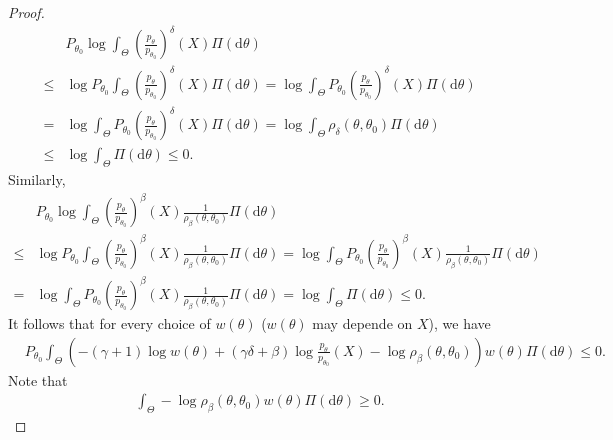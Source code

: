 \documentclass[11pt]{article}
\theoremstyle{plain}
\theoremstyle{definition}
\theoremstyle{remark}
\begin{document}
\begin{proof}
\begin{align*}
        &P_{\theta_0}\log \int_{\Theta} \left(\frac{p_\theta }{ p_{\theta_0}}\right)^\delta (X) \Pi (\mathrm d \theta)
        \\
        \leq
        &
        \log  P_{\theta_0}\int_{\Theta} \left(\frac{p_\theta }{ p_{\theta_0}}\right)^\delta (X) \Pi (\mathrm d \theta)
        = 
        \log  \int_{\Theta} P_{\theta_0} \left(\frac{p_\theta }{ p_{\theta_0}}\right)^\delta (X) \Pi (\mathrm d \theta)
        \\
        = &
        \log  \int_{\Theta} P_{\theta_0} \left(\frac{p_\theta }{ p_{\theta_0}}\right)^\delta (X) \Pi (\mathrm d \theta)
        = 
        \log  \int_{\Theta} \rho_{\delta}(\theta, \theta_0) \Pi (\mathrm d \theta)
        \\
        \leq &
        \log  \int_{\Theta}  \Pi (\mathrm d \theta)
        \leq 0
        .
    \end{align*}
    Similarly,
    \begin{align*}
        &P_{\theta_0}\log \int_{\Theta} \left(\frac{p_\theta }{ p_{\theta_0}}\right)^\beta (X) \frac{1}{\rho_\beta (\theta, \theta_0)} \Pi (\mathrm d \theta)
        \\
        \leq
        &
        \log  P_{\theta_0}\int_{\Theta} \left(\frac{p_\theta }{ p_{\theta_0}}\right)^\beta (X) \frac{1}{\rho_\beta (\theta, \theta_0)}\Pi (\mathrm d \theta)
        = 
        \log  \int_{\Theta} P_{\theta_0} \left(\frac{p_\theta }{ p_{\theta_0}}\right)^\beta (X) \frac{1}{\rho_\beta (\theta, \theta_0)}\Pi (\mathrm d \theta)
        \\
        = &
        \log  \int_{\Theta} P_{\theta_0} \left(\frac{p_\theta }{ p_{\theta_0}}\right)^\beta (X) \frac{1}{\rho_\beta (\theta, \theta_0)}\Pi (\mathrm d \theta)
        = 
        \log  \int_{\Theta}  \Pi (\mathrm d \theta)
        \leq 0
        .
    \end{align*}
    It follows that for every choice of $w(\theta)$ ($w(\theta)$ may depende on $X$), we have
    \begin{align*}
        &
        P_{\theta_0}
        \int_{\Theta} \left( -(\gamma + 1) \log w(\theta) + (  \gamma\delta + \beta  ) \log \frac{p_\theta}{p_{\theta_0}}(X) - \log \rho_\beta (\theta, \theta_0) \right) w(\theta) \Pi(\mathrm d \theta) 
        \leq 
        0.
    \end{align*}
    Note that
    \begin{align*}
        \int_{\Theta}  - \log \rho_\beta (\theta, \theta_0)  w(\theta) \Pi(\mathrm d \theta) 
        \geq 
        0.
    \end{align*}

\end{proof}
\end{document}
